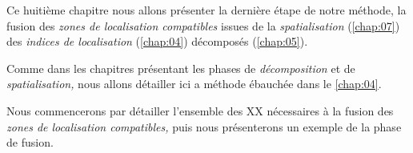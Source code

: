 Ce huitième chapitre nous allons présenter la dernière étape de notre
méthode, la fusion des \emph{zones de localisation compatibles} issues
de la \emph{spatialisation} (\autoref{chap:07}) des \emph{indices de
  localisation} (\autoref{chap:04}) décomposés (\autoref{chap:05}).

Comme dans les chapitres présentant les phases de \emph{décomposition}
et de \emph{spatialisation,} nous allons détailler ici a méthode
ébauchée dans le \autoref{chap:04}.

Nous commencerons par détailler l'ensemble des XX nécessaires à la
fusion des \emph{zones de localisation compatibles,} puis nous
présenterons un exemple de la phase de fusion.

